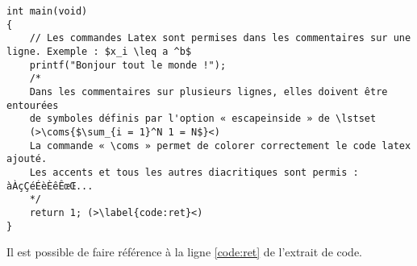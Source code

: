 \begin{lstlisting}[caption={AAAA}]
int main(void)
{
    // Les commandes Latex sont permises dans les commentaires sur une ligne. Exemple : $x_i \leq a ^b$
    printf("Bonjour tout le monde !");
    /*
    Dans les commentaires sur plusieurs lignes, elles doivent être entourées
    de symboles définis par l'option « escapeinside » de \lstset
    (>\coms{$\sum_{i = 1}^N 1 = N$}<)
    La commande « \coms » permet de colorer correctement le code latex ajouté.
    Les accents et tous les autres diacritiques sont permis : àÀçÇéÉèÈêÊœŒ...
    */
    return 1; (>\label{code:ret}<)
}
\end{lstlisting}

Il est possible de faire référence à la ligne \ref{code:ret} de l'extrait de code.


